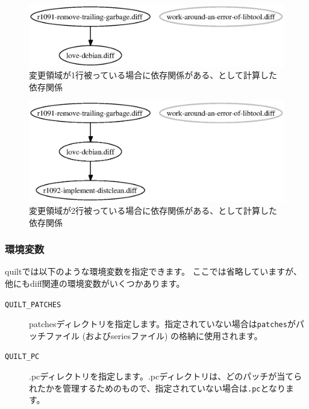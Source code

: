 \documentclass[mingoth,a4paper]{jsarticle}
\begin{document}
\begin{figure}[htbp]
  \begin{center}
   \includegraphics[scale=0.8]{image200701/patchdep-2.eps}
  \end{center}
  \caption{変更領域が1行被っている場合に依存関係がある、として計算した依存関係}
  \label{fig:patchdep-overlap-1line}
\end{figure}

\begin{figure}[htbp]
  \begin{center}
   \includegraphics[scale=0.8]{image200701/patchdep-3.eps}
  \end{center}
  \caption{変更領域が2行被っている場合に依存関係がある、として計算した依存関係}
  \label{fig:patchdep-overlap-2line}
\end{figure}

\subsubsection{環境変数}
\label{subsubsec:quilt-env}

quiltでは以下のような環境変数を指定できます。
ここでは省略していますが、他にもdiff関連の環境変数がいくつかあります。

\begin{description}
 \item[\texttt{QUILT\_PATCHES}] patchesディレクトリを指定します。指定されていない場合は\texttt{patches}がパッチファイル (およびseriesファイル) の格納に使用されます。
 \item[\texttt{QUILT\_PC}] .pcディレクトリを指定します。.pcディレクトリは、どのパッチが当てられたかを管理するためのもので、指定されていない場合は\texttt{.pc}となります。
\end{description}
\end{document}
